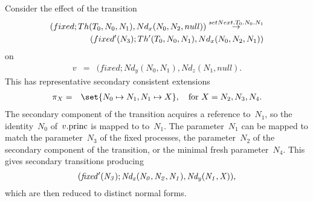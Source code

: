 
\begin{example}
Consider the effect of the transition
\[
\begin{align}
(fixed; Th(T_0,N_0,N_1), Nd_x(N_0,N_2,null))   \stackrel{setNext.T_0.N_0.N_1}\rightarrow \\
\qquad (fixed'(N_3); Th'(T_0,N_0,N_1), Nd_x(N_0,N_2,N_1)) 
\end{align}
\]
on
\begin{eqnarray*}
v & = &  (fixed; Nd_y(N_0,N_1), Nd_z(N_1,null).
\end{eqnarray*}
%
This has representative secondary consistent extensions
\begin{eqnarray*}
\pi_X & = & \set{N_0 \mapsto N_1, N_1 \mapsto X},
  \quad \mbox{for $X = N_2, N_3, N_4$}.
\end{eqnarray*}
%
The secondary component of the transition acquires a reference to~$N_1$, so
the identity~$N_0$ of~$v.\mathrm{princ}$ is mapped to to~$N_1$.  The parameter~$N_1$
can be mapped to match the parameter~$N_3$ of the fixed processes, the
parameter~$N_2$ of the secondary component of the transition, or the minimal
fresh parameter~$N_4$.
%
This gives secondary transitions producing
\[{\it
(fixed'(N_3); Nd_x(N_0,N_2,N_1), Nd_y(N_1,X)),}
\] 
which are then reduced to distinct normal forms.
\end{example}



